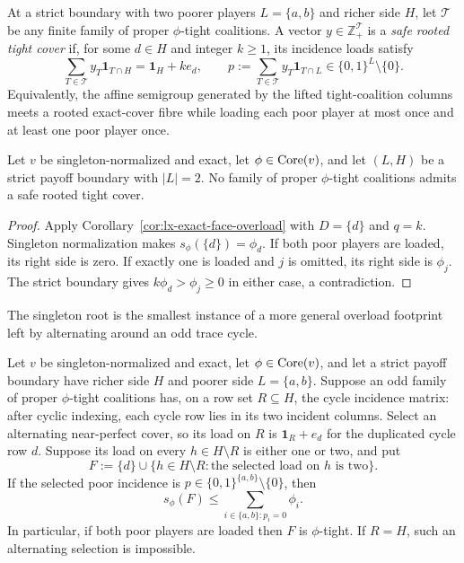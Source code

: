 \begin{definition}
\label{def:lx-safe-rooted-tight-cover}
At a strict boundary with two poorer players $L=\{a,b\}$ and richer side
$H$, let $\mathcal T$ be any finite family of proper $\phi$-tight
coalitions.  A vector $y\in\mathbb Z_+^{\mathcal T}$ is a \emph{safe rooted
tight cover} if, for some $d\in H$ and integer $k\geq1$, its incidence loads
satisfy
\[
 \sum_{T\in\mathcal T}y_T\mathbf1_{T\cap H}
   =\mathbf1_H+k e_d,
 \qquad
 p:=\sum_{T\in\mathcal T}y_T\mathbf1_{T\cap L}
   \in\{0,1\}^{L}\setminus\{0\}.                  \tag{SRC}
 \label{eq:lx-safe-rooted-tight-cover}
\]
Equivalently, the affine semigroup generated by the lifted tight-coalition
columns meets a rooted exact-cover fibre while loading each poor player at
most once and at least one poor player once.
\end{definition}

\begin{theorem}
\label{thm:lx-rooted-semigroup-obstruction}
Let $v$ be singleton-normalized and exact, let $\phi\in\operatorname{Core}(v)$, and let
$(L,H)$ be a strict payoff boundary with $|L|=2$.  No family of proper
$\phi$-tight coalitions admits a safe rooted tight cover.
\end{theorem}

\begin{proof}
Apply Corollary~\ref{cor:lx-exact-face-overload} with $D=\{d\}$ and $q=k$.
Singleton normalization makes $s_\phi(\{d\})=\phi_d$.  If both poor players
are loaded, its right side is zero.  If exactly one is loaded and $j$ is
omitted, its right side is $\phi_j$.  The strict boundary gives
$k\phi_d>\phi_j\geq0$ in either case, a contradiction.
\end{proof}

The singleton root is the smallest instance of a more general overload
footprint left by alternating around an odd trace cycle.

\begin{lemma}
\label{lem:lx-odd-cycle-overload-footprint}
Let $v$ be singleton-normalized and exact, let $\phi\in\operatorname{Core}(v)$, and let a
strict payoff boundary have richer side $H$ and poorer side
$L=\{a,b\}$.  Suppose an odd family of proper $\phi$-tight coalitions has,
on a row set $R\subseteq H$, the cycle incidence matrix: after cyclic
indexing, each cycle row lies in its two incident columns.  Select an
alternating near-perfect cover, so its load on $R$ is
$\mathbf1_R+e_d$ for the duplicated cycle row $d$.  Suppose its load on
every $h\in H\setminus R$ is either one or two, and put
\[
 F:=\{d\}\cup
    \{h\in H\setminus R:\text{the selected load on $h$ is two}\}.
 \tag{OC-F}\label{eq:lx-odd-cycle-footprint}
\]
If the selected poor incidence is
$p\in\{0,1\}^{\{a,b\}}\setminus\{0\}$, then
\[
 s_\phi(F)\leq\sum_{i\in\{a,b\}:p_i=0}\phi_i.       \tag{OC-B}
 \label{eq:lx-odd-cycle-footprint-budget}
\]
In particular, if both poor players are loaded then $F$ is $\phi$-tight.
If $R=H$, such an alternating selection is impossible.
\end{lemma}

